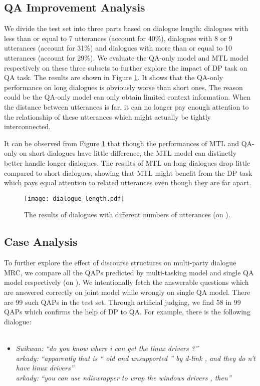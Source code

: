 \documentclass[11pt]{article}
\begin{document}
\subsection{QA Improvement Analysis}\label{subsec:QA improvement analysis}
We divide the test set into three parts based on dialogue length: dialogues with less than or equal to 7 utterances (account for 40\%), dialogues with 8 or 9 utterances (account for 31\%) and dialogues with more than or equal to 10 utterances (account for 29\%). We evaluate the QA-only model and MTL model respectively on these three subsets to further explore the impact of DP task on QA task. The results are shown in Figure \ref{fig:dialogue length}. It shows that the QA-only performance on long dialogues is obviously worse than short ones. The reason could be the QA-only model can only obtain limited context information. When the distance between utterances is far, it can no longer pay enough attention to the relationship of these utterances which might actually be tightly interconnected.

It can be observed from Figure \ref{fig:dialogue length} that though the performances of MTL and QA-only on short dialogues have little difference, the MTL model can distinctly better handle longer dialogues. The results of MTL on long dialogues drop little compared to short dialogues, showing that MTL might benefit from the DP task which pays equal attention to related utterances even though they are far apart.
\begin{figure}[ht]
		\centering
		\texttt{[image: dialogue\_length.pdf]}
		\caption{\label{fig:dialogue length}The results of dialogues with different numbers of utterances (on ).}
\end{figure}

\subsection{Case Analysis}\label{subsubsec:case analysis} 
To further explore the effect of discourse structures on multi-party dialogue MRC, we compare all the QAPs predicted by multi-tasking model and single QA model respectively (on ). We intentionally fetch the answerable questions which are answered correctly on joint model while wrongly on single QA model. There are 99 such QAPs in the test set. Through artificial judging, we find 58 in 99 QAPs 
which confirms the help of DP to QA. For example, there is the following dialogue:
\\  \\
\vspace{-1cm}
\begin{itemize}[leftmargin=0.3cm]
\item[]
	 \textit{Suikwan:}  \textit{``do you know where i can get the linux drivers ?''} \\
	 \textit{arkady:}  \textit{``apparently that is `` old and unsupported '' by d-link , and they do n't have linux drivers''} \\
	 \textit{arkady:}  \textit{``you can use ndiswrapper to wrap the windows drivers , then''}\\
\end{itemize}
\vspace{-0.5cm}
\end{document}
